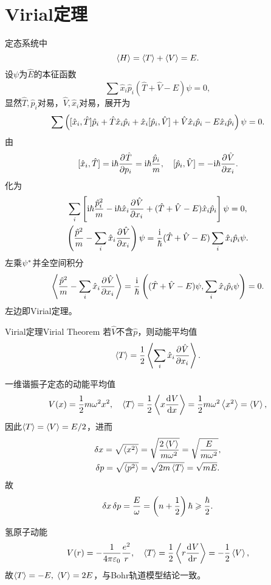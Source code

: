 \section{Virial定理}
定态系统中
\[
	\ave H=\ave T+\ave V=E.
\]
设$\psi$为$\hat E$的本征函数
\[
	\sum\hat x_i\hat p_i(\hat T+\hat V-E)\psi=0,
\]
显然$\hat T,\hat p_i$对易，$\hat V,\hat x_i$对易，展开为
\[
	\sum \kh{\cmm{x_i}T\hat p_i+\hat T\hat x_i\hat p_i+\hat x_i\cmm{p_i}V+\hat V\hat x_i\hat p_i-E\hat x_i\hat p_i}\psi=0.
\]
由
\[
	\cmm{x_i}T=\i\hbar\pv{\hat T}{p_i}=\i\hbar\frac{\hat p_i}m,\quad \cmm{p_i}V=-\i\hbar\pv{\hat V}{x_i}.
\]
化为
\begin{gather*}
	\sum_i\fkh{\i\hbar\frac{\hat p_i^2}m-\i\hbar\hat x_i\pv{\hat V}{x_i}+(\hat T+\hat V-E)\hat x_i\hat p_i}\psi=0,\\
	\kh{\frac{\hat p^2}m-\sum_i\hat x_i\pv{\hat V}{x_i}}\psi=\frac\i\hbar(\hat T+\hat V-E)\sum_i\hat x_i\hat p_i\psi.
\end{gather*}
左乘$\psi\cj$并全空间积分
\[
	\ave{\frac{\hat p^2}m-\sum_i\hat x_i\pv{\hat V}{x_i}}=\frac\i\hbar\kh{(\hat T+\hat V-E)\psi,\sum_i\hat x_i\hat p_i\psi}=0.
\]
左边即Virial定理。
\begin{theorem}{Virial定理}{Virial Theorem}
	若$\hat V$不含$\hat p$，则动能平均值
	\begin{align}
		\ave T=\frac12\ave{\sum_i\hat x_i\pv{\hat V}{x_i}}.
	\end{align}
\end{theorem}
\begin{example}{一维谐振子定态的动能平均值}{}
	\[
		V(x)=\frac12m\omega^2x^2,\quad\ave T=\frac12\ave{x\dv Vx}=\frac12m\omega^2\ave{x^2}=\ave V,
	\]
	因此$\ave T=\ave V=E/2$，进而
	\begin{gather*}
		\delta x=\sqrt{\ave{x^2}}=\sqrt{\frac{2\ave V}{m\omega^2}}=\sqrt{\frac E{m\omega^2}},\\
		\delta p=\sqrt{\ave{p^2}}=\sqrt{2m\ave T}=\sqrt{mE}.
	\end{gather*}
	故
	\[
		\delta x\,\delta p=\frac E\omega=\kh{n+\frac12}\hbar\geqslant\frac\hbar{2}.
	\]
\end{example}
\begin{example}{氢原子动能}{}
	\[
		V(r)=-\frac1{4\pi\varepsilon_0}\frac{e^2}r,\quad\ave T=\frac12\ave{r\dv Vr}=-\frac12\ave V,
	\]
	故$\ave T=-E,\;\ave V=2E$，与Bohr轨道模型结论一致。
\end{example}
